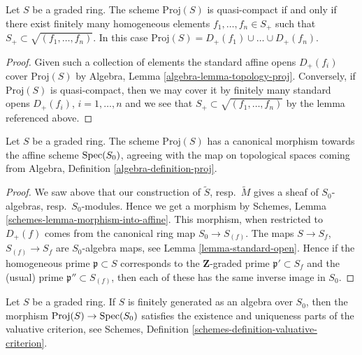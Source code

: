 \begin{lemma}
\label{lemma-proj-quasi-compact}
Let $S$ be a graded ring.
The scheme $\text{Proj}(S)$ is quasi-compact if and only
if there exist finitely many homogeneous elements
$f_1, \ldots, f_n \in S_{+}$ such that
$S_{+} \subset \sqrt{(f_1, \ldots, f_n)}$. In this case
$\text{Proj}(S) = D_+(f_1) \cup \ldots \cup D_+(f_n)$.
\end{lemma}

\begin{proof}
Given such a collection of elements the standard affine opens
$D_{+}(f_i)$ cover $\text{Proj}(S)$ by
Algebra, Lemma \ref{algebra-lemma-topology-proj}.
Conversely, if $\text{Proj}(S)$ is quasi-compact, then we
may cover it by finitely many standard opens
$D_{+}(f_i)$, $i = 1, \ldots, n$ and we see that
$S_{+} \subset \sqrt{(f_1, \ldots, f_n)}$ by the
lemma referenced above.
\end{proof}

\begin{lemma}
\label{lemma-structure-morphism-proj}
Let $S$ be a graded ring. The scheme $\text{Proj}(S)$ has a canonical morphism
towards the affine scheme $\mathop{\mathrm{Spec}}(S_0)$, agreeing with the map on
topological spaces coming from
Algebra, Definition \ref{algebra-definition-proj}.
\end{lemma}

\begin{proof}
We saw above that our construction of $\widetilde S$,
resp.\ $\widetilde M$ gives a sheaf of $S_0$-algebras, resp.\ $S_0$-modules.
Hence we get a morphism by
Schemes, Lemma \ref{schemes-lemma-morphism-into-affine}.
This morphism, when restricted to $D_{+}(f)$ comes from the
canonical ring map $S_0 \to S_{(f)}$. The maps
$S \to S_f$, $S_{(f)} \to S_f$ are $S_0$-algebra maps, see
Lemma \ref{lemma-standard-open}.
Hence if the homogeneous prime $\mathfrak p \subset S$
corresponds to the $\mathbf{Z}$-graded prime $\mathfrak p' \subset S_f$
and the (usual) prime $\mathfrak p'' \subset S_{(f)}$, then
each of these has the same inverse image in $S_0$.
\end{proof}

\begin{lemma}
\label{lemma-proj-valuative-criterion}
Let $S$ be a graded ring. If $S$ is finitely generated as
an algebra over $S_0$, then
the morphism $\text{Proj}(S) \to \mathop{\mathrm{Spec}}(S_0)$ satisfies
the existence and uniqueness parts of the valuative criterion,
see Schemes, Definition \ref{schemes-definition-valuative-criterion}.
\end{lemma}

